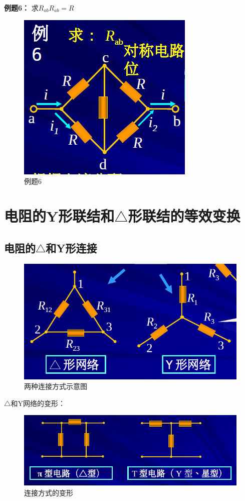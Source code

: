\documentclass[11pt,a4paper,oneside]{book}
\begin{document}
\noindent\textbf{例题6：}
求$R_{ab}$\quad $R_{ab}=R$
\begin{figure}[H]
	\centering
	\includegraphics[width=0.3\linewidth]{screenshot004}
	\caption{例题6}
	\label{fig:screenshot004}
\end{figure}

\section{电阻的Y形联结和$\triangle$形联结的等效变换}
\subsection{电阻的$\triangle$和Y形连接}
\begin{figure}[H]
	\centering
	\includegraphics[width=0.5\linewidth]{screenshot005}
	\caption{两种连接方式示意图}
	\label{fig:screenshot005}
\end{figure}
$\triangle$和Y网络的变形：
\begin{figure}[H]
	\centering
	\includegraphics[width=0.5\linewidth]{screenshot006}
	\caption{连接方式的变形}
	\label{fig:screenshot006}
\end{figure}
\end{document}
